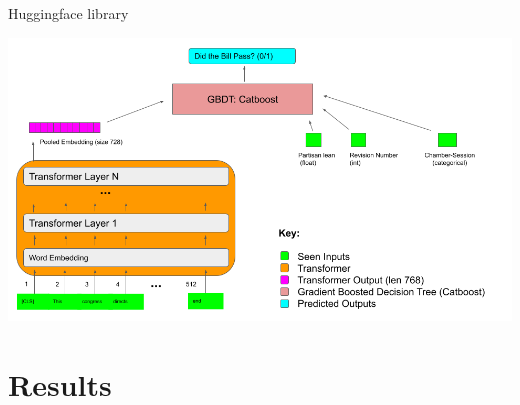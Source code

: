 \documentclass[11pt]{article}
\begin{document}
Huggingface library \cite{huggingface}

\includegraphics[width=150mm]{figures/network_architecture.jpg}

\section{Results}
\end{document}
